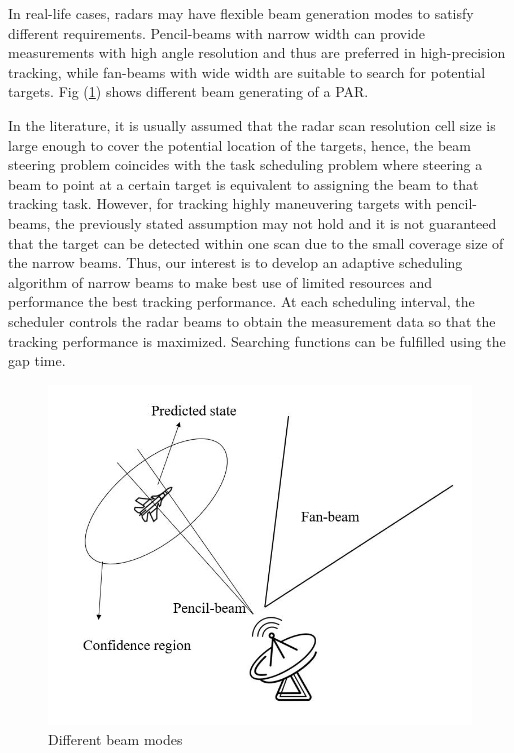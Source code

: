 \documentclass[12pt,journal,draftclsnofoot,onecolumn]{IEEEtran}
\begin{document}
In real-life cases, radars may have flexible beam generation modes to satisfy different requirements. Pencil-beams with narrow width can provide measurements with high angle resolution and thus are preferred in high-precision tracking, while fan-beams with wide width are suitable to search for potential targets. Fig (\ref{fig:beams}) shows different beam generating of a PAR.
 
In the literature, it is usually assumed that the radar scan resolution cell size is large enough to cover the potential location of the targets\cite{hernandez2004multisensor,bar2004estimation}, hence, the beam steering problem coincides with the task scheduling problem where steering a beam to point at a certain target is equivalent to assigning the beam to that tracking task. However, for tracking highly maneuvering targets with pencil-beams, the previously stated assumption may not hold and it is not guaranteed that the target can be detected within one scan due to the small coverage size of the narrow beams. Thus, our interest is to develop an adaptive scheduling algorithm of narrow beams to make best use of limited resources and performance the best tracking performance. At each scheduling interval, the scheduler controls the radar beams to obtain the measurement data so that the tracking performance is maximized. Searching functions can be fulfilled using the gap time\cite{kang2004coordinated}.

\begin{figure}
	\centering
	\includegraphics[scale=0.38]{Two Beams.jpg}
	\caption{Different beam modes}
	\label{fig:beams}
\end{figure}
\end{document}
